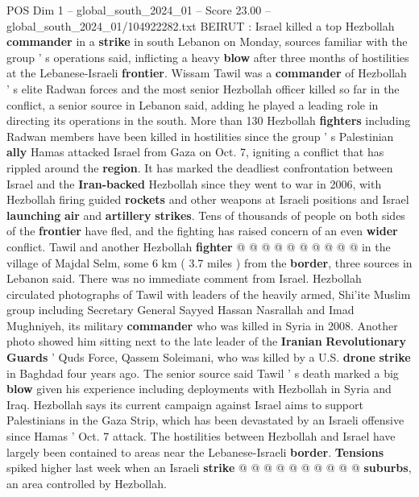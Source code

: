\begin{textsample}{POS Dim 1 – global\_south\_2024\_01 – Score 23.00 – global\_south\_2024\_01/104922282.txt}  \label{ex:f1_pos_104}
BEIRUT : Israel killed a top Hezbollah \textbf{commander} in a \textbf{strike} in south Lebanon on Monday, sources familiar with the group ' s operations said, inflicting a heavy \textbf{blow} after three months of hostilities at the Lebanese-Israeli \textbf{frontier}.
Wissam Tawil was a \textbf{commander} of Hezbollah ' s elite Radwan forces and the most senior Hezbollah officer killed so far in the conflict, a senior source in Lebanon said, adding he played a leading role in directing its operations in the south.
More than 130 Hezbollah \textbf{fighters} including Radwan members have been killed in hostilities since the group ' s Palestinian \textbf{ally} Hamas attacked Israel from Gaza on Oct. 7, igniting a conflict that has rippled around the \textbf{region}.
It has marked the deadliest confrontation between Israel and the \textbf{Iran-backed} Hezbollah since they went to war in 2006, with Hezbollah firing guided \textbf{rockets} and other weapons at Israeli positions and Israel \textbf{launching} \textbf{air} and \textbf{artillery} \textbf{strikes}.
Tens of thousands of people on both sides of the \textbf{frontier} have fled, and the fighting has raised concern of an even \textbf{wider} conflict.
Tawil and another Hezbollah \textbf{fighter} @ @ @ @ @ @ @ @ @ @ in the village of Majdal Selm, some 6 km ( 3.7 miles ) from the \textbf{border}, three sources in Lebanon said.
There was no immediate comment from Israel.
Hezbollah circulated photographs of Tawil with leaders of the heavily armed, Shi'ite Muslim group including Secretary General Sayyed Hassan Nasrallah and Imad Mughniyeh, its military \textbf{commander} who was killed in Syria in 2008.
Another photo showed him sitting next to the late leader of the \textbf{Iranian} \textbf{Revolutionary} \textbf{Guards} ' Quds Force, Qassem Soleimani, who was killed by a U.S. \textbf{drone} \textbf{strike} in Baghdad four years ago.
The senior source said Tawil ' s death marked a big \textbf{blow} given his experience including deployments with Hezbollah in Syria and Iraq.
Hezbollah says its current campaign against Israel aims to support Palestinians in the Gaza Strip, which has been devastated by an Israeli offensive since Hamas ' Oct. 7 attack.
The hostilities between Hezbollah and Israel have largely been contained to areas near the Lebanese-Israeli \textbf{border}. \textbf{Tensions} spiked higher last week when an Israeli \textbf{strike} @ @ @ @ @ @ @ @ @ @ \textbf{suburbs}, an area controlled by Hezbollah.

\end{textsample}
